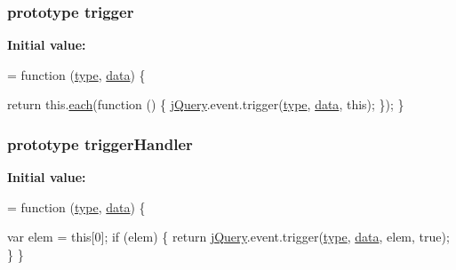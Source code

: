 \subsubsection[{\texorpdfstring{trigger}{trigger}}]{ {\bf prototype} trigger}\hypertarget{jquery-2_82_81-vsdoc_8js_a2388c4114d5e3e4eab020f973641519c}{}\label{jquery-2_82_81-vsdoc_8js_a2388c4114d5e3e4eab020f973641519c}
{\bfseries Initial value\+:}
\begin{DoxyCode}
= \textcolor{keyword}{function} (\hyperlink{jquery-2_82_81-vsdoc_8js_a3940565e83a9bfd10d95ffd27536da91}{type}, \hyperlink{jquery-2_82_81-vsdoc_8js_a609407b3456fdc3c5671a9fc4a226ff7}{data}) \{
        

        \textcolor{keywordflow}{return} this.\hyperlink{jquery-2_82_81-vsdoc_8js_a77da68323b96573f900f8b5dd3a47954}{each}(\textcolor{keyword}{function} () \{
            \hyperlink{jquery-2_82_81-vsdoc_8js_add5237586d970a38a81f990e8eb28c6c}{jQuery}.event.trigger(\hyperlink{jquery-2_82_81-vsdoc_8js_a3940565e83a9bfd10d95ffd27536da91}{type}, \hyperlink{jquery-2_82_81-vsdoc_8js_a609407b3456fdc3c5671a9fc4a226ff7}{data}, \textcolor{keyword}{this});
        \});
    \}
\end{DoxyCode}
\subsubsection[{\texorpdfstring{trigger\+Handler}{triggerHandler}}]{ {\bf prototype} trigger\+Handler}\hypertarget{jquery-2_82_81-vsdoc_8js_afe18935b86e978c91a4ae291ad8825c8}{}\label{jquery-2_82_81-vsdoc_8js_afe18935b86e978c91a4ae291ad8825c8}
{\bfseries Initial value\+:}
\begin{DoxyCode}
= \textcolor{keyword}{function} (\hyperlink{jquery-2_82_81-vsdoc_8js_a3940565e83a9bfd10d95ffd27536da91}{type}, \hyperlink{jquery-2_82_81-vsdoc_8js_a609407b3456fdc3c5671a9fc4a226ff7}{data}) \{
        

        var elem = \textcolor{keyword}{this}[0];
        \textcolor{keywordflow}{if} (elem) \{
            \textcolor{keywordflow}{return} \hyperlink{jquery-2_82_81-vsdoc_8js_add5237586d970a38a81f990e8eb28c6c}{jQuery}.event.trigger(\hyperlink{jquery-2_82_81-vsdoc_8js_a3940565e83a9bfd10d95ffd27536da91}{type}, \hyperlink{jquery-2_82_81-vsdoc_8js_a609407b3456fdc3c5671a9fc4a226ff7}{data}, elem, \textcolor{keyword}{true});
        \}
    \}
\end{DoxyCode}
